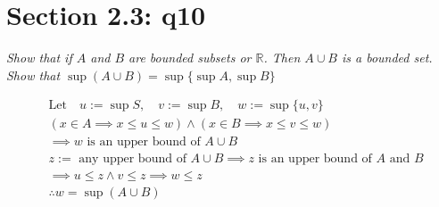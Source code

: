 \documentclass[11pt]{article}
\newcommand{\question}[1]{
    \begin{mdframed}[
        linecolor=gray,       %
        linewidth=0.5pt,      %
        innertopmargin=10pt,  %
        innerbottommargin=10pt %
    ]
    \centering \itshape \color{gray} #1
    \end{mdframed}
}
\theoremstyle{plain}
\begin{document}
\section*{Section 2.3: q10}
\question{Show that if $A$ and $B$ are bounded subsets or $\mathbb{R}$. Then $A \cup B$ is a bounded set. \\ Show that $\sup (A \cup B) = \sup \{ \sup A, \sup B \}$}
$$
	\begin{aligned}
		& \text{Let} \quad u:=\sup S, \quad v:=\sup B, \quad w:=\sup \{ u,v \}                                 \\
		& (x \in A \implies x \leq u \leq w) \land (x \in B \implies x \leq v \leq w)                          \\
		& \implies w \text{ is an upper bound of } A \cup B                                                    \\
		& z := \text{ any upper bound of } A \cup B \implies  z \text{ is an upper bound of } A \text{ and } B \\
		& \implies  u \leq z \land  v \leq z \implies w \leq z                                                 \\
		& \therefore w = \sup(A \cup B)                                                                        \\
	\end{aligned}
$$
\end{document}
